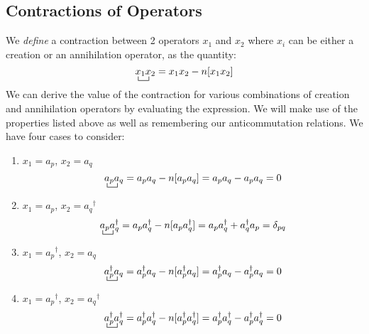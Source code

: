 \documentclass{article}
\newcommand{\ctr}{\bcontraction}
\newcommand{\dg}{\ensuremath{^\dagger} }
\begin{document}
\subsection{Contractions of Operators}

We \textit{define} a contraction between 2 operators $x_1$ and $x_2$ where $x_i$ can be either a creation or an annihilation operator, as the quantity: 
$$
\ctr{}{x}{{}_1}{x}
x_1 x_2 = x_1x_2 - n[x_1x_2]
$$
We can derive the value of the contraction for various combinations of creation and annihilation operators by evaluating the expression. 
We will make use of the properties listed above as well as remembering our anticommutation relations.
We have four cases to consider: 
\begin{enumerate}
\item $x_1 = a_p$, $x_2 = a_q$ \\
$$
\ctr{}{a}{{}_p}{a}
a_p a_q = a_p a_q  - n[a_p a_q] = a_p a_q  - a_p a_q  = 0 
$$
\item $x_1 = a_p$, $x_2 = a_q\dg$ \\
$$
\ctr{}{a}{{}_p}{a}
a_p a_q\dg = a_p a_q\dg  - n[a_p a_q\dg] = a_p a_q\dg  +  a_q\dg a_p = \delta_{pq}
$$
\item $x_1 = a_p\dg$, $x_2 = a_q$ \\
$$
\ctr{}{a}{{}_p}{a}
a_p\dg a_q = a_p\dg a_q  - n[a_p\dg a_q] = a_p\dg a_q  - a_p\dg a_q  = 0 
$$
\item $x_1 = a_p\dg$, $x_2 = a_q\dg$ \\
$$
\ctr{}{a}{{}_p}{a}
a_p\dg a_q\dg = a_p\dg a_q\dg  - n[a_p\dg a_q\dg] = a_p\dg a_q\dg  - a_p\dg a_q\dg  = 0 
$$

\end{enumerate}
\end{document}
